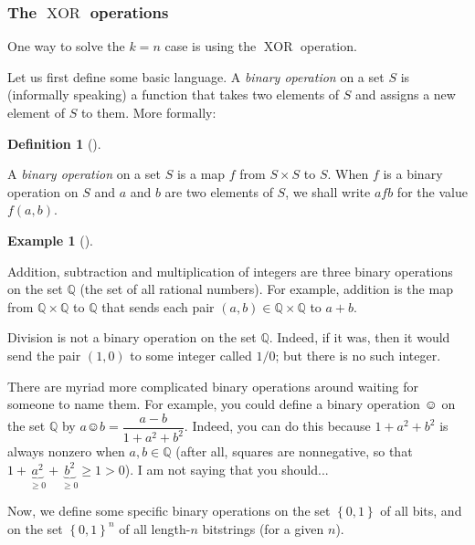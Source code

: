 \documentclass[numbers=enddot,12pt,final,onecolumn,notitlepage]{scrartcl}%
\numberwithin{exer}{subsection}
\theoremstyle{definition}
\newtheorem{defi}[theo]{Definition}
\newenvironment{definition}[1][]
{\begin{defi}[#1]\begin{leftbar}}
{\end{leftbar}\end{defi}}
\newtheorem{exam}[theo]{Example}
\newenvironment{example}[1][]
{\begin{exam}[#1]\begin{leftbar}}
{\end{leftbar}\end{exam}}
\begin{document}
\subsubsection{The $\operatorname*{XOR}$ operations}

One way to solve the $k=n$ case is using the $\operatorname*{XOR}$ operation.

Let us first define some basic language. A \textit{binary operation} on a set
$S$ is (informally speaking) a function that takes two elements of $S$ and
assigns a new element of $S$ to them. More formally:

\begin{definition}
\label{def.intro.binop}A \textit{binary operation} on a set $S$ is a map $f$
from $S\times S$ to $S$. When $f$ is a binary operation on $S$ and $a$ and $b$
are two elements of $S$, we shall write $afb$ for the value $f\left(
a,b\right)  $.
\end{definition}

\begin{example}
Addition, subtraction and multiplication of integers are three binary
operations on the set $\mathbb{Q}$ (the set of all rational numbers). For
example, addition is the map from $\mathbb{Q}\times\mathbb{Q}$ to $\mathbb{Q}$
that sends each pair $\left(  a,b\right)  \in\mathbb{Q}\times\mathbb{Q}$ to
$a+b$.

Division is not a binary operation on the set $\mathbb{Q}$. Indeed, if it was,
then it would send the pair $\left(  1,0\right)  $ to some integer called
$1/0$; but there is no such integer.

There are myriad more complicated binary operations around waiting for someone
to name them. For example, you could define a binary operation $\smiley{}$ on
the set $\mathbb{Q}$ by $a\smiley{}b=\dfrac{a-b}{1+a^{2}+b^{2}}$. Indeed, you
can do this because $1+a^{2}+b^{2}$ is always nonzero when $a,b\in\mathbb{Q}$
(after all, squares are nonnegative, so that $1+\underbrace{a^{2}}_{\geq
0}+\underbrace{b^{2}}_{\geq0}\geq1>0$). I am not saying that you should...
\end{example}

Now, we define some specific binary operations on the set $\left\{
0,1\right\}  $ of all bits, and on the set $\left\{  0,1\right\}  ^{n}$ of all
length-$n$ bitstrings (for a given $n$).
\end{document}
